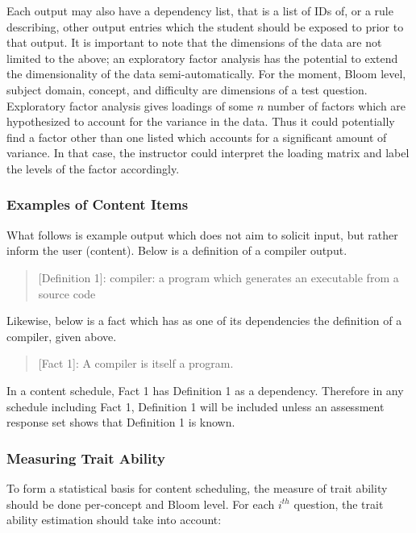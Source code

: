 Each output may also have a dependency list, that is a list of IDs of, or a
rule describing, other output entries which the student should be exposed to
prior to that output.  It is important to note that the dimensions of the data
are not limited to the above; an exploratory factor analysis has the potential
to extend the dimensionality of the data semi-automatically.  For the moment,
Bloom level, subject domain, concept, and difficulty are dimensions of a test
question.  Exploratory factor analysis gives loadings of some $n$ number of
factors which are hypothesized to account for the variance in the data.  Thus
it could potentially find a factor other than one listed which accounts for a
significant amount of variance. In that case, the instructor could interpret
the loading matrix and label the levels of the factor accordingly.

\subsubsection{Examples of Content Items}

What follows is example output which does not aim to solicit input, but rather
inform the user (content).  Below is a definition of a compiler output.

\begin{quote}
[Definition 1]: compiler: a program which generates an executable from a source
code
\end{quote}

Likewise, below is a fact which has as one of its dependencies the definition
of a compiler, given above.

\begin{quote}
[Fact 1]: A compiler is itself a program.
\end{quote}

In a content schedule, Fact 1 has Definition 1 as a dependency. Therefore in
any schedule including Fact 1, Definition 1 will be included unless an
assessment response set shows that Definition 1 is known.

\subsubsection{Measuring Trait Ability}

To form a statistical basis for content scheduling, the measure of trait
ability should be done per-concept and Bloom level.  For each $i^{th}$
question, the trait ability estimation should take into account:

